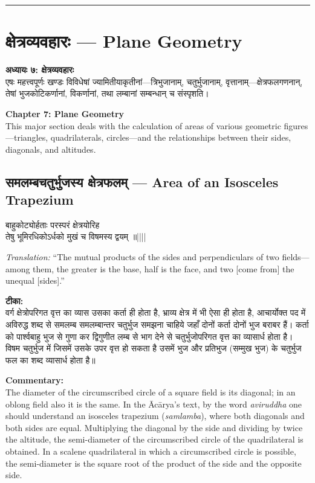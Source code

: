 \documentclass[10pt,a4paper]{article}
\newcommand{\dev}[1]{{\devanagarifont #1}}
\newcommand{\longline}{\noindent\rule{\textwidth}{0.4pt}}
\newcommand{\vnum}[1]{\hfill\textnormal{||#1||}}
\newenvironment{shloka}{%
  \begin{lrbox}{\shlokabox}
  \begin{minipage}{\dimexpr\textwidth-16pt\relax}%
  \devanagarifont\centering\setstretch{1.3}%
}{%
  \end{minipage}%
  \end{lrbox}%
  \par\medskip\noindent\fcolorbox{rulecolor}{versebg}{\usebox{\shlokabox}}\par\medskip
}
\newcommand{\bilingual}[2]{%
  \noindent%
  \begin{minipage}[t]{0.47\textwidth}%
    \setstretch{1.15}#1%
  \end{minipage}%
  \hfill%
  \vrule\hfill%
  \begin{minipage}[t]{0.47\textwidth}%
    \setstretch{1.15}#2%
  \end{minipage}%
  \par\medskip
}
\begin{document}
\vspace{0.5em}
\noindent\longline
\vspace{0.5em}

\section{\dev{क्षेत्रव्यवहारः} --- Plane Geometry}

\bilingual{%
\textbf{अध्यायः ७: क्षेत्रव्यवहारः}\\[0.3em]
एषः महत्त्वपूर्णः खण्डः विविधेषां ज्यामितीयाकृतीनां---त्रिभुजानाम्, चतुर्भुजानाम्, वृत्तानाम्---क्षेत्रफलगणनान्, तेषां भुजकोटिकर्णानां, विकर्णानां, तथा लम्बानां सम्बन्धान् च संस्पृशति।
}{%
\textbf{Chapter 7: Plane Geometry}\\[0.3em]
This major section deals with the calculation of areas of various geometric figures---triangles, quadrilaterals, circles---and the relationships between their sides, diagonals, and altitudes.
}

\subsection{\dev{समलम्बचतुर्भुजस्य क्षेत्रफलम्} --- Area of an Isosceles Trapezium}

\bilingual{%
\begin{shloka}
बाहुकोट्योर्हताः परस्परं क्षेत्रयोरिह\\
तेषु भूमिरधिकोऽर्धको मुखं च विषमस्य द्वयम् ॥\vnum{}
\end{shloka}
}{%
\textit{Translation:} ``The mutual products of the sides and perpendiculars of two fields---among them, the greater is the base, half is the face, and two [come from] the unequal [sides].''
}

\bilingual{%
\textbf{टीका:}\\[0.3em]
वर्ग क्षेत्रोपरिगत वृत्त का व्यास उसका कर्ता ही होता है, भ्राव्य क्षेत्र में भी ऐसा ही होता है, आचार्योक्त पद में अविरुद्ध शब्द से समलम्ब समलम्बान्तर चतुर्भुज समझना चाहिये जहाँ दोनों कर्ता दोनों भुज बराबर हैं। कर्ता को पार्श्वबाहु भुज से गुणा कर द्विगुणीत लम्ब से भाग देने से चतुर्भुजोपरिगत वृत्त का व्यासार्ध होता है। विषम चतुर्भुज में जिसमें उसके उपर वृत्त हो सकता है उसमें भुज और प्रतिभुज (सम्मुख भुज) के चतुर्भुज फल का शब्द व्यासार्ध होता है॥
}{%
\textbf{Commentary:}\\[0.3em]
The diameter of the circumscribed circle of a square field is its diagonal; in an oblong field also it is the same. In the Ācārya's text, by the word \textit{aviruddha} one should understand an isosceles trapezium (\textit{samlamba}), where both diagonals and both sides are equal. Multiplying the diagonal by the side and dividing by twice the altitude, the semi-diameter of the circumscribed circle of the quadrilateral is obtained. In a scalene quadrilateral in which a circumscribed circle is possible, the semi-diameter is the square root of the product of the side and the opposite side.
}
\end{document}
